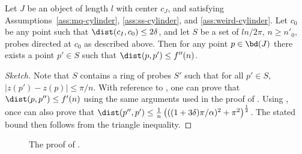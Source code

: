 \begin{lem}
Let $J$ be an object of length $l$ with center $c_J$, and satisfying
Assumptions~\ref{ass:mq-cylinder}, \ref{ass:ss-cylinder}, and
\ref{ass:weird-cylinder}.  Let $c_0$ be any point such that
$\dist(c_I,c_0)\le 2\delta$, and let $S$ be a set of $ln/2\pi$, $n\ge
n'_0$, probes directed at $c_0$ as described above.  Then for any
point $p\in\bd(J)$ there exists a point $p'\in S$ such that $\dist(p,
p')\le f''(n)$.
\end{lem}

\begin{proof}[Sketch]
Note that $S$ contains a ring of probes $S'$ such that for all $p'\in
S$, $|z(p')-z(p)|\le \pi/n$.  With reference to , one
can prove that $\dist(p,p'')\le f'(n)$ using the same arguments used
in the proof of .  Using ,
once can also prove that $\dist(p'',p')\le \frac{1}{n}\left(
((1+3\delta)\pi/\alpha)^2 + \pi^2 \right)^\frac{1}{2}$.  The stated
bound then follows from the triangle inequality. 
\end{proof}

\begin{figure}
\caption{The proof of .}
\end{figure}



